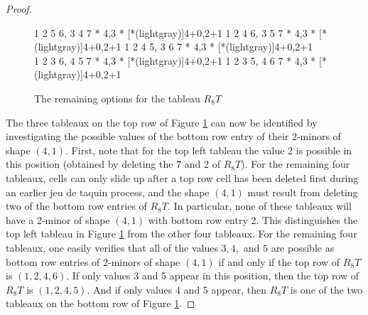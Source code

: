 \documentclass[12pt]{amsart}
\theoremstyle{definition}
\theoremstyle{remark}
\numberwithin{equation}{section}
\numberwithin{figure}{section}
\begin{document}
\begin{proof}
	\begin{figure}[H]
		\centering
    \ytableaushort
        {1 2 5 6,
        3 4 7}
        * {4,3}
        * [*(lightgray)]{4+0,2+1}
		\;\;\;\;\;\;\;
    \ytableaushort
        {1 2 4 6,
        3 5 7}
        * {4,3}
        * [*(lightgray)]{4+0,2+1}
    		\;\;\;\;\;\;\;
    \ytableaushort
        {1 2 4 5,
        3 6 7}
        * {4,3}
        * [*(lightgray)]{4+0,2+1}
  \\[.5cm]
    \ytableaushort
        {1 2 3 6,
        4 5 7}
        * {4,3}
        * [*(lightgray)]{4+0,2+1}
		\;\;\;\;\;\;\;
    \ytableaushort
        {1 2 3 5,
        4 6 7}
        * {4,3}
        * [*(lightgray)]{4+0,2+1}
        \;\;\;\;\;\;\;\;\;\;\;\;\;\;\;\;\;\;\;\;\;\;\;\;\;\;\;\;\;\;\;\;\;\;\;\;
		\caption{The remaining options for the tableau $R_8T$}
		\label{figure: 5 tableaux}
	\end{figure}

 The three tableaux on the top row of Figure \ref{figure: 5 tableaux} can now be identified by investigating the possible values of the bottom row entry of their 2-minors of shape $(4,1)$. First, note that for the top left tableau the value 2 is possible in this position (obtained by deleting the 7 and 2 of $R_8T$). For the remaining four tableaux, cells can only slide up after a top row cell has been deleted first during an earlier jeu de taquin process, and the shape $(4,1)$ must result from deleting two of the bottom row entries of $R_8T$. In particular, none of these tableaux will have a 2-minor of shape $(4,1)$ with bottom row entry 2. This distinguishes the top left tableau in Figure \ref{figure: 5 tableaux} from the other four tableaux. For the remaining four tableaux, one easily verifies that all of the values $3,4,$ and $5$ are possible as bottom row entries of 2-minors of shape $(4,1)$ if and only if the top row of $R_8T$ is $(1,2,4,6)$. If only values 3 and 5 appear in this position, then the top row of $R_8T$ is $(1,2,4,5)$. And if only values 4 and 5 appear, then $R_8T$ is one of the two tableaux on the bottom row of Figure \ref{figure: 5 tableaux}.


\end{proof}
\end{document}

